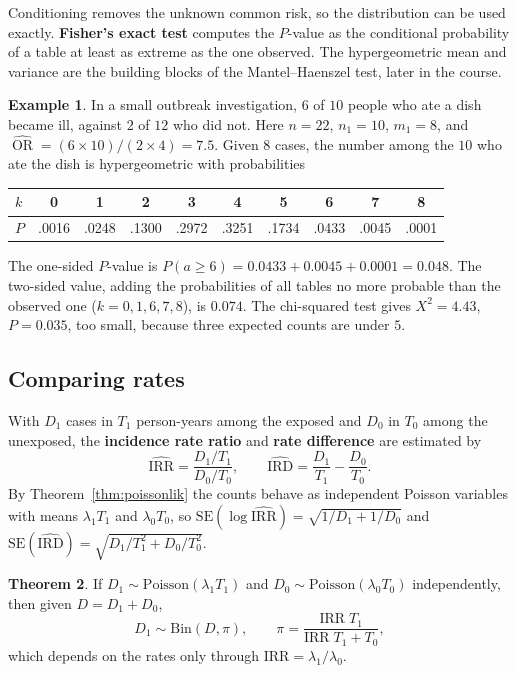 \documentclass[11pt,a4paper]{article}
\numberwithin{equation}{section}
\DeclareMathOperator{\OR}{OR}
\theoremstyle{definition}
\newtheorem{thm}{Theorem}[subsection]
\newtheorem{exa}[thm]{Example}
\begin{document}
Conditioning removes the unknown common risk, so the distribution can be used exactly. \textbf{Fisher's exact test} computes the
$P$-value as the conditional probability of a table at least as extreme as the one observed. The hypergeometric mean and variance are
the building blocks of the Mantel--Haenszel test, later in the course.

\begin{exa}
\label{exa:fisher}
In a small outbreak investigation, $6$ of $10$ people who ate a dish became ill, against $2$ of $12$ who did not. Here $n = 22$, $n_1 = 10$,
$m_1 = 8$, and $\widehat{\OR} = (6 \times 10)/(2 \times 4) = 7.5$. Given $8$ cases, the number among the $10$ who ate the dish is hypergeometric with
probabilities
\begin{center}
\begin{tabular}{lccccccccc}
\hline
$k$ & 0 & 1 & 2 & 3 & 4 & 5 & 6 & 7 & 8 \\
\hline
$P$ & .0016 & .0248 & .1300 & .2972 & .3251 & .1734 & .0433 & .0045 & .0001 \\
\hline
\end{tabular}
\end{center}
The one-sided $P$-value is $P(a \geq 6) = 0.0433 + 0.0045 + 0.0001 = 0.048$. The two-sided value, adding the probabilities of all tables no
more probable than the observed one ($k = 0, 1, 6, 7, 8$), is $0.074$. The chi-squared test gives $X^2 = 4.43$, $P = 0.035$, too small, because
three expected counts are under $5$.
\end{exa}

\subsection{Comparing rates}
\label{sec:rateratio}

With $D_1$ cases in $T_1$ person-years among the exposed and $D_0$ in $T_0$ among the unexposed, the \textbf{incidence rate ratio} and
\textbf{rate difference} are estimated by
\[
\widehat{\text{IRR}} = \frac{D_1/T_1}{D_0/T_0}, \qquad \widehat{\text{IRD}} = \frac{D_1}{T_1} - \frac{D_0}{T_0} .
\]
By Theorem~\ref{thm:poissonlik} the counts behave as independent Poisson variables with means $\lambda_1 T_1$ and $\lambda_0 T_0$, so
$\text{SE}(\log\widehat{\text{IRR}}) = \sqrt{1/D_1 + 1/D_0}$ and $\text{SE}(\widehat{\text{IRD}}) = \sqrt{D_1/T_1^2 + D_0/T_0^2}$.

\begin{thm}
\label{thm:ratecond}
If $D_1 \sim \text{Poisson}(\lambda_1 T_1)$ and $D_0 \sim \text{Poisson}(\lambda_0 T_0)$ independently, then given $D = D_1 + D_0$,
\[
D_1 \sim \text{Bin}(D, \pi), \qquad \pi = \frac{\text{IRR}\;T_1}{\text{IRR}\;T_1 + T_0} ,
\]
which depends on the rates only through $\text{IRR} = \lambda_1/\lambda_0$.
\end{thm}
\end{document}

